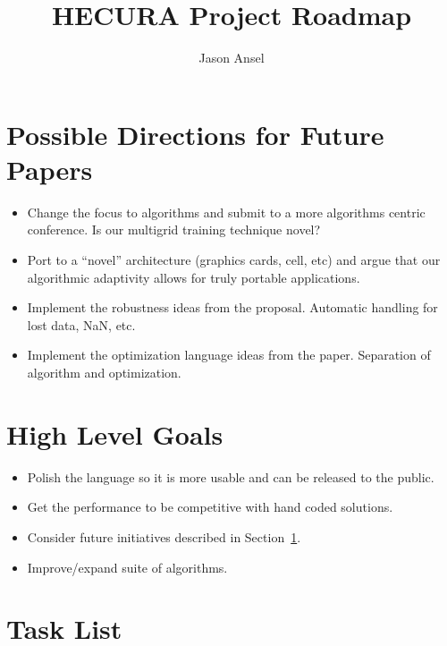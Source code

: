 \documentclass[11pt]{article}
\begin{document}
\title{HECURA Project Roadmap}
\author{Jason Ansel}
\maketitle
\tableofcontents


\section{Possible Directions for Future Papers}
\label{future}
\begin{itemize}

\item Change the focus to algorithms and submit to a more algorithms
    centric conference.  Is our multigrid training technique novel?

\item Port to a ``novel'' architecture (graphics cards, cell, etc)
    and argue that our algorithmic adaptivity allows for truly portable
    applications.

\item Implement the robustness ideas from the proposal. Automatic handling
    for lost data, NaN, etc.

\item Implement the optimization language ideas from the paper.
    Separation of algorithm and optimization.

\end{itemize}

\section{High Level Goals}
\begin{itemize}

\item Polish the language so it is more usable and can be released to
the public.

\item Get the performance to be competitive with hand coded solutions.

\item Consider future initiatives described in Section~\ref{future}.

\item Improve/expand suite of algorithms.

\end{itemize}

\section{Task List}
\end{document}
